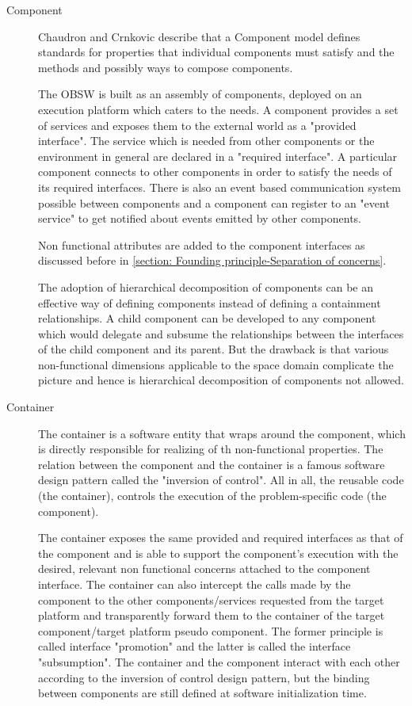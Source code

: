\begin{description}
\item[Component] Chaudron and Crnkovic describe that a Component model defines standards for properties that individual components must satisfy and the methods and possibly ways to compose components.

The OBSW is built as an assembly of components, deployed on an execution platform which caters to the needs. A component provides a set of services and exposes them to the external world as a "provided interface". The service which is needed from other components or the environment in general are declared in a "required interface". A particular component connects to other components in order to satisfy the needs of its required interfaces. There is also an event based communication system possible between components and a component can register to an "event service" to get notified about events emitted by other components.

Non functional attributes are added to the component interfaces as discussed before in \cref {section: Founding principle-Separation of concerns}.

The adoption of hierarchical decomposition of components can be an effective way of defining components instead of defining a containment relationships. A child component can be developed to any component which would delegate and subsume the relationships between the interfaces of the child component and its parent. But the drawback is that various non-functional dimensions applicable to the space domain complicate the picture and hence is hierarchical decomposition of components not allowed.
    
\item [Container] The container is a software entity that wraps around the component, which is directly responsible for realizing of th non-functional properties. The relation between the component and the container is a famous software design pattern called the "inversion of control". All in all, the reusable code (the container), controls the execution of the problem-specific code (the component).

The container exposes the same provided and required interfaces as that of the component and is able to support the component's execution with the desired, relevant non functional concerns attached to the component interface. The container can also intercept the calls made by the component to the other components/services requested from the target platform and transparently forward them to the container of the target component/target platform pseudo component. The former principle is called interface "promotion" and the latter is called the interface "subsumption". The container and the component interact with each other according to the inversion of control design pattern, but the binding between components are still defined at software initialization time.


\end{description}
